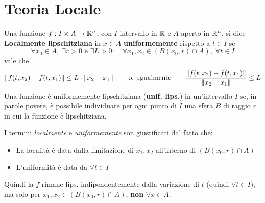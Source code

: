 \section{Teoria Locale}
\begin{definition}
	\label{def:loc_lips}
	Una funzione $f:I\times A\to \mathbb{R}^n$, con $I$ intervallo in $\mathbb{R}$ e $A$ aperto in $\mathbb{R}^n$, si dice \textbf{Localmente lipschitziana} in $x\in A$ \textbf{uniformemente} rispetto a $t \in I$ se
	\[\forall x_0 \in A,\; \exists r > 0 \text{ e } \exists L > 0:\quad \forall x_1,x_2 \in (B(x_0,r)\cap A),\; \forall t\in I\]
	\hfil vale che
	\[
		\left\|f(t,x_2)-f(t,x_1)\right\|\leq L\cdot\left\|x_2-x_1\right\|
		\qquad\text{o, ugualmente}\qquad
		\frac{\left\|f(t,x_2)-f(t,x_1)\right\|}{\left\|x_2-x_1\right\|}\leq L
	\]
	Una funzione è uniformemente lipschitziana (\textbf{unif. lips.}) in un'intervallo $I$ se, in parole povere, è possibile individuare per ogni punto di $I$ una sfera $B$ di raggio $r$ in cui la funzione è lipschitziana.
\end{definition}
\begin{note}
	I termini \textit{localmente} e \textit{uniformemente} son giustificati dal fatto che:
	\begin{itemize}[noitemsep]
		\item La località è data dalla limitazione di $x_1,x_2$ all'interno di $(B(x_0,r)\cap A)$
		\item L'uniformità è data da $\forall t\in I$
	\end{itemize}
	Quindi la $f$ rimane lips. indipendentemente dalla variazione di $t$ (quindi $\forall t\in I$), ma solo per $x_1,x_2 \in (B(x_0,r)\cap A)$, \textbf{non} $\forall x\in A$.
\end{note}

